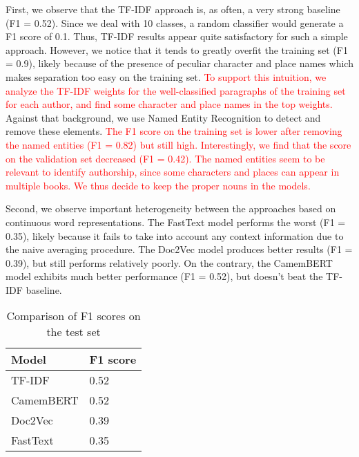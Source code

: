 \documentclass[11pt,a4paper]{article}
\begin{document}
First, we observe that the TF-IDF approach is, as often, a very strong baseline (F1 = 0.52). Since we deal with 10 classes, a random classifier would generate a F1 score of 0.1. Thus, TF-IDF results appear quite satisfactory for such a simple approach.  However, we notice that it tends to greatly overfit the training set (F1 = 0.9), likely because of the presence of peculiar character and place names which makes separation too easy on the training set. \textcolor{red}{To support this intuition, we analyze the TF-IDF weights for the well-classified paragraphs of the training set for each author, and find some character and place names in the top weights.} Against that background, we use Named Entity Recognition to detect and remove these elements. \textcolor{red}{The F1 score on the training set is lower after removing the named entities (F1 = 0.82) but still high. Interestingly, we find that the score on the validation set decreased (F1 = 0.42). The named entities seem to be relevant to identify authorship, since some characters and places can appear in multiple books. We thus decide to keep the proper nouns in the models.}

Second, we observe important heterogeneity between the approaches based on continuous word representations. The FastText model performs the worst (F1 = 0.35), likely because it fails to take into account any context information due to the naive averaging procedure. The Doc2Vec model produces better results (F1 = 0.39), but still performs relatively poorly. On the contrary, the CamemBERT model exhibits much better performance (F1 = 0.52), but doesn't beat the TF-IDF baseline.



\begin{table}[]
\caption{Comparison of F1 scores on the test set}
\label{compar}
\begin{center}
\begin{tabular}{|l|l|}
\hline
\textbf{Model} & \textbf{F1 score} \\ \hline
TF-IDF         & 0.52              \\ \hline
CamemBERT       & 0.52                  \\ \hline
Doc2Vec        & 0.39                  \\ \hline
FastText      & 0.35                  \\ \hline
\end{tabular}
\end{center}
\end{table}
\end{document}
